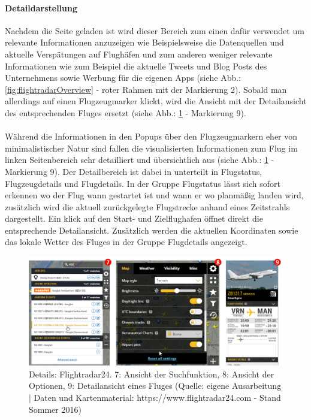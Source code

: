 \documentclass[../Bachelorarbeit.tex]{subfiles}
\begin{document}
\paragraph{Detaildarstellung}
\label{flightradarDetaildarstellung}
Nachdem die Seite geladen ist wird dieser Bereich zum einen dafür verwendet um relevante Informationen anzuzeigen wie Beispielsweise die Datenquellen und aktuelle Verspätungen auf Flughäfen und zum anderen weniger relevante Informationen wie zum Beispiel die aktuelle Tweets und Blog Posts des Unternehmens sowie Werbung für die eigenen Apps (siehe Abb.: \ref{fig:flightradarOverview} - roter Rahmen mit der Markierung 2). 
Sobald man allerdings auf einen Flugzeugmarker klickt, wird die Ansicht mit der Detailansicht des entsprechenden Fluges ersetzt (siehe Abb.: \ref{fig:flightradarDetail} - Markierung 9).\\
\\
Während die Informationen in den Popups über den Flugzeugmarkern eher von minimalistischer Natur sind fallen die visualisierten Informationen zum Flug im linken Seitenbereich sehr detailliert und übersichtlich aus (siehe Abb.: \ref{fig:flightradarDetail} - Markierung 9). 
Der Detailbereich ist dabei in unterteilt in Flugstatus, Flugzeugdetails und Flugdetails.
In der Gruppe Flugstatus lässt sich sofort erkennen wo der Flug wann gestartet ist und wann er wo planmäßig landen wird, zusätzlich wird die aktuell zurückgelegte Flugstrecke anhand eines Zeitstrahls dargestellt.
Ein klick auf den Start- und Zielflughafen öffnet direkt die entsprechende Detailansicht.
Zusätzlich werden die aktuellen Koordinaten sowie das lokale Wetter des Fluges in der Gruppe Flugdetails angezeigt. 

\begin{figure}[H]
\centering
\includegraphics[width=1\linewidth]{img/StandDerTechnik/flightradarDetail}
\caption[Details: Flightradar24]{Details: Flightradar24. 7: Ansicht der Suchfunktion, 8: Ansicht der Optionen, 9: Detailansicht eines Fluges (Quelle: eigene Ausarbeitung | Daten und Kartenmaterial: https://www.flightradar24.com - Stand Sommer 2016)}
\label{fig:flightradarDetail}
\end{figure}
\end{document}
